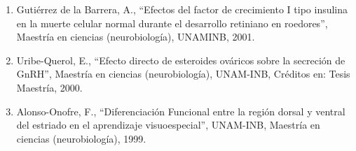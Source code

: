\begin{enumerate}
\item Gutiérrez de la Barrera, A., “Efectos del factor de crecimiento I tipo insulina en la muerte celular normal durante 
el 
desarrollo retiniano en roedores”, Maestría en ciencias (neurobiología), UNAMINB, 2001.

\item Uribe-Querol, E., “Efecto directo de esteroides ováricos sobre la secreción de GnRH”, Maestría en ciencias 
(neurobiología), UNAM-INB, Créditos en: Tesis Maestría, 2000.

\item Alonso-Onofre, F., “Diferenciación Funcional entre la región dorsal y ventral del estriado en el aprendizaje 
visuoespecial”, UNAM-INB, Maestría en ciencias (neurobiología), 1999.

\end{enumerate}
